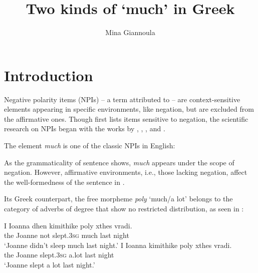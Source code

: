 \documentclass[output=paper]{langscibook}
\author{Mina Giannoula\affiliation{University of Chicago}}
\title{Two kinds of `much' in Greek}
\begin{document}
\maketitle


\section{Introduction} 

Negative polarity items (NPIs) -- a term attributed to \citet{baker1970} -- are context-sensitive elements appearing in specific environments, like negation, but are excluded from the affirmative ones. Though \citet{buyssens1959} first lists items sensitive to negation, the scientific research on NPIs began with the works by \citet{klima1964}, \citet{horn1972prop}, \citet{fauconnier1975a, fauconnier1975b}, and \citet{ladusaw1979}.

The element \textit{much} is one of the classic NPIs in English:

\ea\label{gia:ex1}
        \label{gia:ex1a}
        \label{gia:ex1b}
\z\z

\noindent As the grammaticality of sentence  shows, \textit{much} appears under the scope of negation. However, affirmative environments, i.e., those lacking negation, affect the well-formedness of the sentence in .

Its Greek counterpart, the free morpheme \textit{poly} ‘much/a lot’ belongs to the category of adverbs of degree that show no restricted distribution, as seen in :

\begin{exe}
\ex\label{gia:ex2} \begin{xlist}
        \ex\label{gia:ex2a} \gll I Ioanna dhen kimithike poly xthes vradi. \\
        the Joanne not slept.\textsc{3sg} much last night \\
        \trans `Joanne didn't sleep much last night.'
        \ex\label{gia:ex2b} \gll I Ioanna kimithike poly xthes vradi. \\
        the Joanne slept.\textsc{3sg} a.lot last night \\
        \trans `Joanne slept a lot last night.'
    \end{xlist}
\end{exe}
\end{document}
